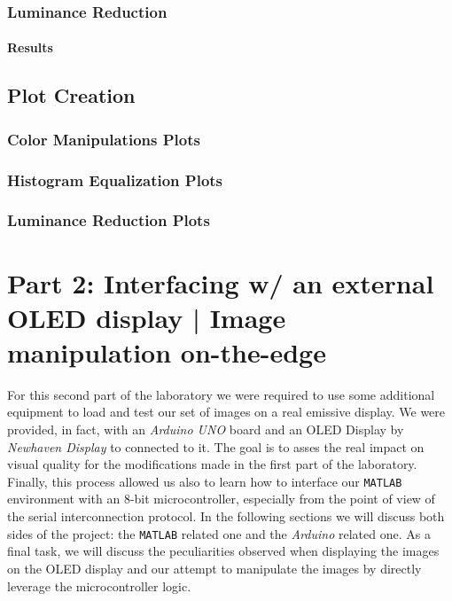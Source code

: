\documentclass[a4paper]{article}
\begin{document}
        \subsubsection{Luminance Reduction}
            \paragraph{Results}

    \subsection{Plot Creation}
        \subsubsection{Color Manipulations Plots}
        \subsubsection{Histogram Equalization Plots}
        \subsubsection{Luminance Reduction Plots}

%
\section{Part 2: Interfacing w/ an external OLED display | Image manipulation on-the-edge}
    For this second part of the laboratory we were required to use some additional equipment to load and test our set of images on a real emissive display. We were provided, in fact, with an \emph{Arduino UNO} board and an OLED Display by \emph{Newhaven Display} to connected to it.
    The goal is to asses the real impact on visual quality for the modifications made in the first part of the laboratory. Finally, this process allowed us also to learn how to interface our \texttt{MATLAB} environment with an 8-bit microcontroller, especially from the point of view of the serial interconnection protocol.
    In the following sections we will discuss both sides of the project: the \texttt{MATLAB} related one and the \emph{Arduino} related one. As a final task, we will discuss the peculiarities observed when displaying the images on the OLED display and our attempt to manipulate the images by directly leverage the microcontroller logic.
\end{document}
